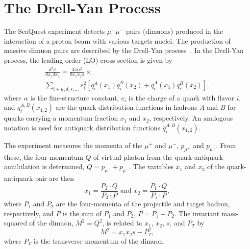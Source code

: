 \documentclass[reprint,aps,unsortedaddress,superscriptaddress,prl,floatfix,showpacs,linenumbers]{revtex4-2}
\begin{document}
\section{The Drell-Yan Process}
\label{sec:drell-yan}
The SeaQuest experiment detects $\mu^+\mu^-$ pairs (dimuons) produced in the interaction of a proton
beam with various targets nuclei. The production of massive dimuon pairs are described by the Drell-Yan
process~\cite{drell1970}. In the Drell-Yan process, the leading order (LO) cross section is given by
\begin{multline}
	\frac{d^2\sigma}{dx_1dx_2}=\frac{4\pi \alpha^2}{9x_1x_2s} \times
	\label{eq:DYCross} \\
	\sum_{i\in u,d,s,\dots} e_i^2 \left[q_i^A\left(x_1\right) \bar q_i^B\left(x_2\right) + \bar q_i^A\left(x_1\right)
		q_i^B\left(x_2\right)\right],
\end{multline}
where $\alpha$ is the fine-structure constant, $e_i$ is the charge of a quark with flavor $i$,
and $q_i^{A,B}\left(x_{1,2}\right)$ are the quark distribution functions in hadrons $A$ and $B$
for quarks carrying a momentum fraction $x_1$ and $x_2$, respectively.
An analogous notation is used for antiquark distribution functions $\bar q_i^{A,B}\left(x_{1,2}\right)$.

The experiment measures the momenta of the $\mu^+$ and $\mu^-$, $p_{\mu^+}$ and $p_{\mu^-}$.
From these, the four-momentum $Q$ of virtual photon from the quark-antiquark annihilation is determined,
$Q = p_{\mu^+} + p_{\mu^-}$.
The variables $x_1$ and $x_2$ of the quark-antiquark pair are then
\begin{equation}
	x_1 = \frac{P_2 \cdot Q}{P_2 \cdot P} \text{ and } x_2 =
	\frac{P_1 \cdot Q}{P_1 \cdot P},
	\label{def_x1x2}
\end{equation}
where $P_1$ and $P_2$ are the four-momenta of the projectile and target hadron,
respectively, and $P$ is the sum of $P_1$ and $P_2$, $P=P_1+P_2$.
The invariant mass-squared of the dimuon, $M^2 = Q^2$, is related to $x_1$, $x_2$, $s$, and $P_T$ by
\begin{equation}
	M^2=x_1 x_2 s - P_T^2,
	\label{def_mass}
\end{equation}
where $P_T$ is the transverse momentum of the dimuon.
\end{document}
